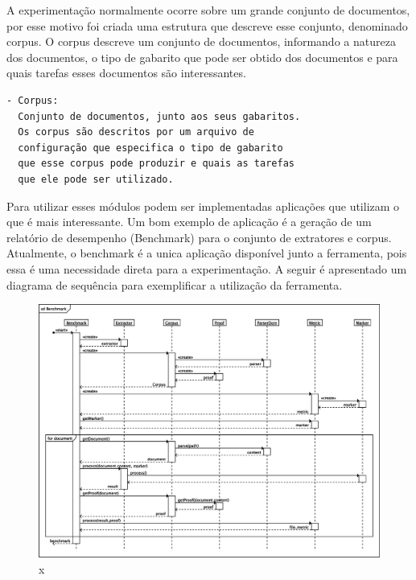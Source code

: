\documentclass[12pt, a4paper]{article}
\begin{document}

A experimentação normalmente ocorre sobre um grande conjunto de
documentos, por esse motivo foi criada uma estrutura que descreve esse
conjunto, denominado corpus. O corpus descreve um conjunto de
documentos, informando a natureza dos documentos, o tipo de gabarito que
pode ser obtido dos documentos e para quais tarefas esses documentos são
interessantes.

\begin{verbatim}
- Corpus: 
  Conjunto de documentos, junto aos seus gabaritos.
  Os corpus são descritos por um arquivo de
  configuração que especifica o tipo de gabarito
  que esse corpus pode produzir e quais as tarefas
  que ele pode ser utilizado.
\end{verbatim}

Para utilizar esses módulos podem ser implementadas aplicações que
utilizam o que é mais interessante. Um bom exemplo de aplicação
é a geração de um relatório de desempenho (Benchmark) para o conjunto de
extratores e corpus. Atualmente, o benchmark é a unica aplicação
disponível junto a ferramenta, pois essa é uma necessidade direta para a
experimentação. A seguir é apresentado um diagrama de sequência para
exemplificar a utilização da ferramenta.

\begin{figure}[htb!]
  \begin{center}
  \includegraphics[width=14cm]{img/fastbenchmark.eps}
  \caption{x}
  \label{x}
  \end{center}
\end{figure}
\end{document}
